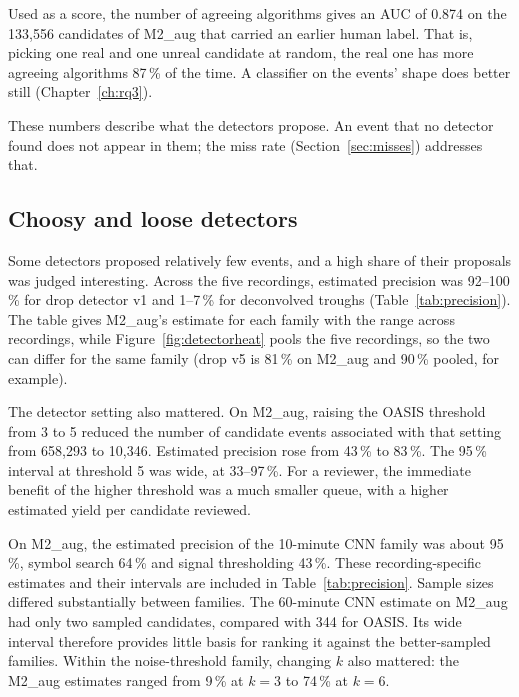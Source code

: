 Used as a score, the number of agreeing algorithms gives an AUC of 0.874 on the 133,556 candidates of M2\_aug that carried an earlier human label. That is, picking one real and one unreal candidate at random, the real one has more agreeing algorithms 87\,\% of the time. A classifier on the events' shape does better still (Chapter~\ref{ch:rq3}).

These numbers describe what the detectors propose. An event that no detector found does not appear in them; the miss rate (Section~\ref{sec:misses}) addresses that.

\subsection{Choosy and loose detectors}

Some detectors proposed relatively few events, and a high share of their proposals was judged interesting. Across the five recordings, estimated precision was 92--100\,\% for drop detector v1 and 1--7\,\% for deconvolved troughs (Table~\ref{tab:precision}). The table gives M2\_aug's estimate for each family with the range across recordings, while Figure~\ref{fig:detectorheat} pools the five recordings, so the two can differ for the same family (drop v5 is 81\,\% on M2\_aug and 90\,\% pooled, for example).

\begin{samepage}
The detector setting also mattered. On M2\_aug, raising the OASIS threshold from 3 to 5 reduced the number of candidate events associated with that setting from 658,293 to 10,346. Estimated precision rose from 43\,\% to 83\,\%. The 95\,\% interval at threshold 5 was wide, at 33--97\,\%. For a reviewer, the immediate benefit of the higher threshold was a much smaller queue, with a higher estimated yield per candidate reviewed.
\par
\end{samepage}

On M2\_aug, the estimated precision of the 10-minute CNN family was about 95\,\%, symbol search 64\,\% and signal thresholding 43\,\%. These recording-specific estimates and their intervals are included in Table~\ref{tab:precision}. Sample sizes differed substantially between families. The 60-minute CNN estimate on M2\_aug had only two sampled candidates, compared with 344 for OASIS. Its wide interval therefore provides little basis for ranking it against the better-sampled families. Within the noise-threshold family, changing $k$ also mattered: the M2\_aug estimates ranged from 9\,\% at $k=3$ to 74\,\% at $k=6$.

